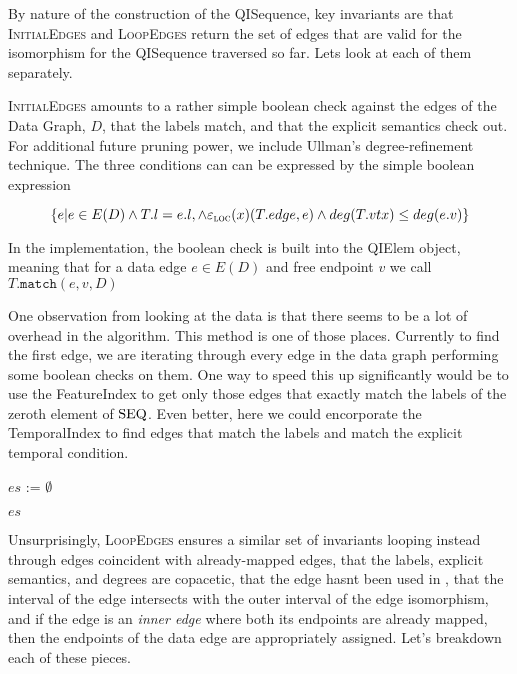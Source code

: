 By nature of the construction of the QISequence, key invariants are that
\textsc{InitialEdges} and \textsc{LoopEdges} return the set of edges that are
valid for the isomorphism for the QISequence traversed so far. Lets look at each
of them separately.

\textsc{InitialEdges} amounts to a rather simple boolean check against the edges
of the Data Graph, $D$, that the labels match, and that the explicit semantics
check out. For additional future pruning power, we include Ullman's
degree-refinement technique. The three conditions can can be expressed by the
simple boolean expression

\[\{e | e \in E(D) \wedge T.l = e.l, \wedge \varepsilon_{\textsc{loc}}(x)(T.edge, e) \wedge
deg(T.vtx) \leq deg(e.v) \}\]

In the implementation, the boolean check is built into the QIElem object,
meaning that for a data edge $e \in E(D)$ and free endpoint $v$ we call
$T.\texttt{match}(e, v, D)$

One observation from looking at the data is that there seems to be a lot of
overhead in the algorithm. This method is one of those places. Currently to find
the first edge, we are iterating through every edge in the data graph performing
some boolean checks on them. One way to speed this up significantly would be to
use the FeatureIndex to get only those edges that exactly match the labels of
the zeroth element of ${\text{SEQ}}$. Even better, here we could encorporate the
TemporalIndex to find edges that match the labels and match the explicit
temporal condition.

\begin{algorithm}
  \label{alg:loop_edges}
  \caption{$\textsc{LoopEdges}(D, T, \iso )$}
  \SetAlgoLined

  $es$ := $\emptyset$\;


  \Return $es$\;
\end{algorithm}

Unsurprisingly, \textsc{LoopEdges} ensures a similar set of invariants looping
instead through edges coincident with already-mapped edges, that the labels,
explicit semantics, and degrees are copacetic, that the edge hasnt been used in
\iso, that the interval of the edge intersects with the outer interval of the
edge isomorphism, and if the edge is an \textit{inner edge} where both its
endpoints are already mapped, then the endpoints of the data edge are
appropriately assigned.  Let's breakdown each of these pieces.


